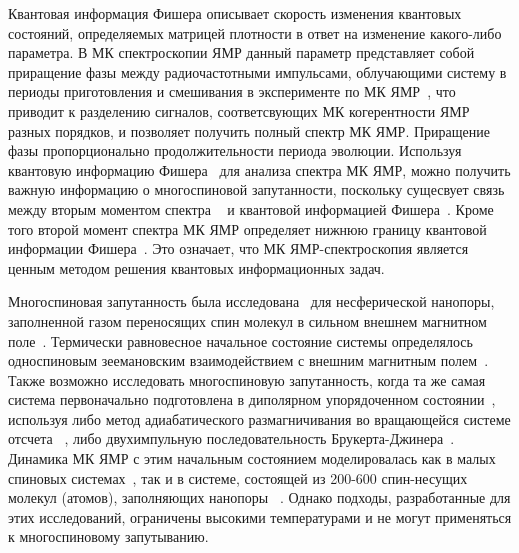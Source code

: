 \documentclass[review]{elsarticle}
\begin{document}
Квантовая информация Фишера описывает скорость изменения квантовых состояний, определяемых матрицей плотности в ответ на изменение какого-либо параметра.
В МК спектроскопии ЯМР данный параметр представляет собой приращение фазы между радиочастотными импульсами, облучающими систему в периоды приготовления и смешивания в эксперименте по МК ЯМР~\cite{Baum_1985}, 
что приводит к разделению сигналов, соответсвующих МК когерентности ЯМР разных порядков, и позволяет получить полный спектр МК ЯМР. 
Приращение фазы пропорционально продолжительности периода эволюции.
Используя квантовую информацию Фишера~\cite{Liu_2014} для анализа спектра МК ЯМР, можно получить важную информацию о многоспиновой запутанности,
поскольку сущесвует связь между вторым моментом спектра ~\cite{Khitrin_1997} и квантовой информацией Фишера~\cite{G_rttner_2018,Doronin_2019}.
Кроме того второй момент спектра МК ЯМР определяет нижнюю границу квантовой информации Фишера~\cite{G_rttner_2018}.
Это означает, что МК ЯМР-спектроскопия является ценным методом решения квантовых информационных задач.

Многоспиновая запутанность была исследована~\cite{Doronin_2019} для несферической нанопоры, заполненной газом переносящих спин молекул в сильном внешнем магнитном поле~\cite{Baugh_2001,Doronin_2009}.
Термически равновесное начальное состояние системы определялось односпиновым зеемановским взаимодействием с внешним магнитным полем~\cite{Doronin_2007a}.
Также возможно исследовать многоспиновую запутанность, когда та же самая система первоначально подготовлена в диполярном упорядоченном состоянии~\cite{Goldman_1970}, используя либо метод адиабатического размагничивания во вращающейся системе отсчета~\cite{Goldman_1970, Slichter_1961} , либо двухимпульную последовательность Брукерта-Джинера~\cite{Goldman_1970, Jeener_1967}.
Динамика МК ЯМР с этим начальным состоянием моделировалась как в малых спиновых системах~\cite{Doronin_2007a, Doronin_2007b}, так и в системе, состоящей из 200-600 спин-несущих молекул (атомов), заполняющих нанопоры ~\cite{Doronin_2011}.
Однако подходы, разработанные для этих исследований, ограничены высокими температурами и не могут применяться к многоспиновому запутыванию.
\end{document}
